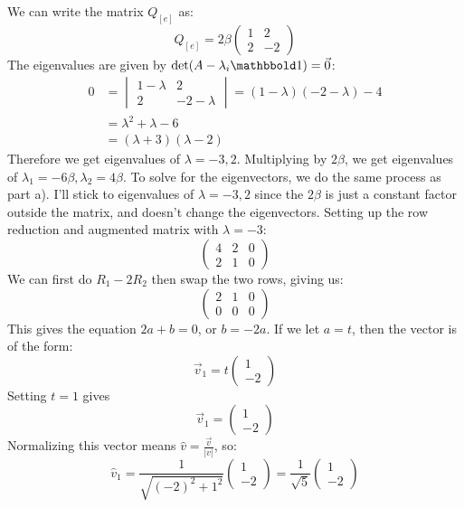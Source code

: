 \documentclass[10pt]{article}
\begin{document}
\begin{enumerate}[label=\alph*)]
		\begin{solution}
			We can write the matrix $Q_{[e]}$ as: 
			\[
				Q_{[e]} = 2 \beta \begin{pmatrix} 1 & 2\\ 2 & -2  \end{pmatrix} 
			\] 
			The eigenvalues are given by $\det(A - \lambda_i \mathbbold 1) = \vec 0$:
			\begin{align*}
				0&=  \begin{vmatrix} 1 - \lambda & 2 \\ 2 & -2 - \lambda\end{vmatrix}=  (1 - \lambda)(-2 - \lambda)
				-4 \\
				 &= \lambda^2 + \lambda - 6\\
				 &= (\lambda + 3)(\lambda - 2)
			\end{align*}
			Therefore we get eigenvalues of $\lambda = -3, 2$. Multiplying by $2 \beta$, we get eigenvalues of
			$\lambda_1 = -6\beta, \lambda_2 = 4\beta$. To solve for the eigenvectors, we do the same process
			as part a). I'll stick to eigenvalues of $\lambda = -3, 2$ since the $2\beta$ is just a constant factor 
			outside the matrix, and doesn't change the eigenvectors. Setting up the row reduction and 
			augmented matrix with $\lambda 
			= -3$:
			\[
				\begin{pmatrix} 4 & 2 & 0\\ 2 & 1 & 0 \end{pmatrix} 
			\] 
			We can first do $R_1 - 2R_2$ then swap the two rows, giving us:
			\[
				\begin{pmatrix} 2 & 1 & 0\\ 0 &0 & 0 \end{pmatrix} 
			\] 
			This gives the equation $2a + b = 0$, or $b = -2a$. If we let $a = t$, then the vector is of 
			the form:
			\[
				\vec 
				v_1 = t\begin{pmatrix} 1\\  -2 \end{pmatrix} 
			\] 
			Setting $t = 1$ gives
			\[
			\vec v_1 = \begin{pmatrix} 1 \\ -2 \end{pmatrix} 
			\] 
			Normalizing this vector means $\hat{v} = \frac{\vec v}{|v|}$, so:
			\[
			\hat{v}_1 = \frac{1}{\sqrt{(-2)^2 + 1^2} }\begin{pmatrix} 1\\-2 \end{pmatrix} = \frac{1}{\sqrt{5} }\begin{pmatrix} 1\\-2 \end{pmatrix} 
\]
\end{solution}
\end{enumerate}
\end{document}
